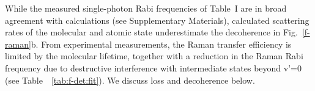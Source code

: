 \documentclass[aps,prl,twocolumn,10pt,superscriptaddress]{revtex4-1}
\newcounter{TRC}
\newcommand{\TR}[1]{\textcolor{violet}{[[\stepcounter{TRC} TR\arabic{TRC}: #1]]}}
\begin{document}


While the measured single-photon Rabi frequencies of Table~I are in broad agreement with calculations (see Supplementary Materials), calculated scattering rates of the molecular and atomic state underestimate the decoherence in Fig.~\ref{f-raman}b.
From experimental measurements, the Raman transfer efficiency is limited by the molecular lifetime, together with a reduction in the Raman Rabi frequency due to destructive interference with intermediate states beyond v'=0 (see Table~~\ref{tab:f-det:fit}). We discuss loss and decoherence below.
\end{document}
